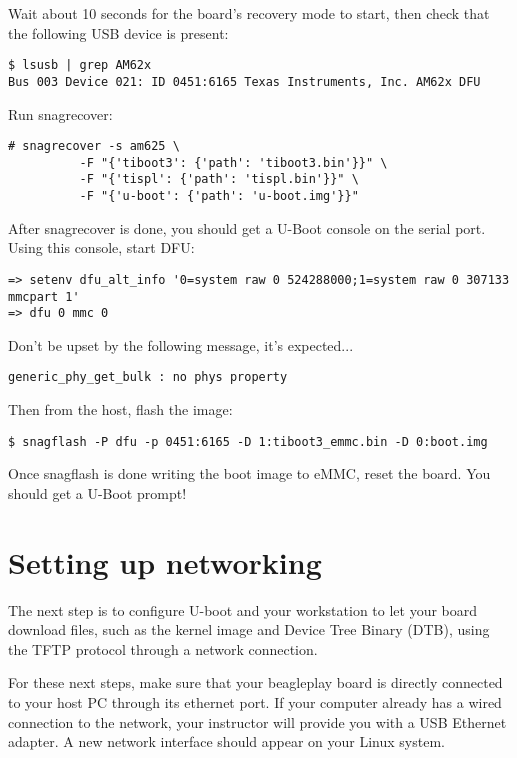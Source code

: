 Wait about 10 seconds for the board's recovery mode to start, then check that
the following USB device is present:

\begin{verbatim}
$ lsusb | grep AM62x
Bus 003 Device 021: ID 0451:6165 Texas Instruments, Inc. AM62x DFU
\end{verbatim}

Run snagrecover:

\begin{verbatim}
# snagrecover -s am625 \
          -F "{'tiboot3': {'path': 'tiboot3.bin'}}" \
          -F "{'tispl': {'path': 'tispl.bin'}}" \
          -F "{'u-boot': {'path': 'u-boot.img'}}"
\end{verbatim}

After snagrecover is done, you should get a U-Boot console on the serial port.
Using this console, start DFU:

\begin{verbatim}
=> setenv dfu_alt_info '0=system raw 0 524288000;1=system raw 0 307133 mmcpart 1'
=> dfu 0 mmc 0
\end{verbatim}

Don't be upset by the following message, it's expected...

\begin{verbatim}
generic_phy_get_bulk : no phys property
\end{verbatim}

Then from the host, flash the image:

\begin{verbatim}
$ snagflash -P dfu -p 0451:6165 -D 1:tiboot3_emmc.bin -D 0:boot.img
\end{verbatim}

Once snagflash is done writing the boot image to eMMC, reset the board. You
should get a U-Boot prompt!

\section{Setting up networking}

The next step is to configure U-boot and your workstation to let your
board download files, such as the kernel image and Device Tree Binary
(DTB), using the TFTP protocol through a network connection.

For these next steps, make sure that your beagleplay board is directly connected
to your host PC through its ethernet port. If your computer already has a wired
connection to the network, your instructor will provide you with a USB Ethernet
adapter. A new network interface should appear on your Linux system.

